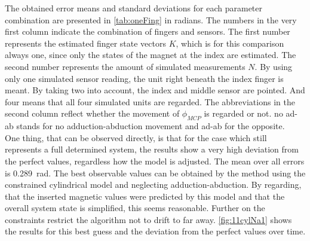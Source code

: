 The obtained error means and standard deviations for each parameter combination are presented in \ref{tab:oneFing} in radians. The numbers in the very first column indicate the combination of fingers and sensors. The first number represents the estimated finger state vectors $ K $, which is for this comparison always one, since only the states of the magnet at the index are estimated. The second number represents the amount of simulated measurements $ N $. By using only one simulated sensor reading, the unit right beneath the index finger is meant. By taking two into account, the index and middle sensor are pointed. And four means that all four simulated units are regarded. The abbreviations in the second column reflect whether the movement of $ \phi_{MCP} $ is regarded or not. \grqq no ad-ab \grqq stands for no adduction-abduction movement and \grqq ad-ab \grqq for the opposite. \\
One thing, that can be observed directly, is that for the case \grqq which still represents a full determined system, the results show a very high deviation from the perfect values, regardless how the model is adjusted. The mean over all errors is \SI{0.289}{\radian}. The best observable values can be obtained by the method using the constrained cylindrical model and neglecting adduction-abduction. By regarding, that the inserted magnetic values were predicted by this model and that the overall system state is simplified, this seems reasonable. Further on the constraints restrict the algorithm not to drift to far away. \ref{fig:11cylNa1} shows the results for this best guess and the deviation from the perfect values over time. \\
